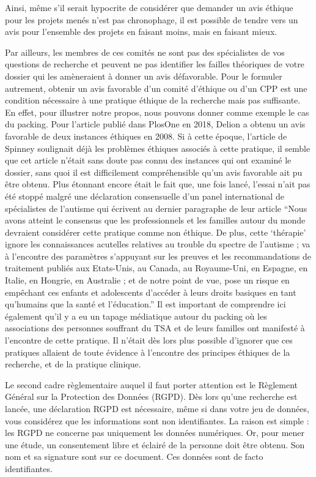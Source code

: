 \documentclass[
  12pt,
]{book}
\begin{document}
Ainsi, même s'il serait hypocrite de considérer que demander un avis éthique pour les projets menés n'est pas chronophage, il est possible de tendre vers un avis pour l'ensemble des projets en faisant moins, mais en faisant mieux.

Par ailleurs, les membres de ces comités ne sont pas des spécialistes de vos questions de recherche et peuvent ne pas identifier les failles théoriques de votre dossier qui les amèneraient à donner un avis défavorable. Pour le formuler autrement, obtenir un avis favorable d'un comité d'éthique ou d'un CPP est une condition nécessaire à une pratique éthique de la recherche mais pas suffisante. En effet, pour illustrer notre propos, nous pouvons donner comme exemple le cas du packing. Pour l'article publié dans PlosOne en 2018, Delion \citeyearpar{Delion2018} a obtenu un avis favorable de deux instances éthiques en 2008. Si à cette époque, l'article de Spinney \citeyearpar{Spinney2007} soulignait déjà les problèmes éthiques associés à cette pratique, il semble que cet article n'était sans doute pas connu des instances qui ont examiné le dossier, sans quoi il est difficilement compréhensible qu'un avis favorable ait pu être obtenu. Plus étonnant encore était le fait que, une fois lancé, l'essai n'ait pas été stoppé malgré une déclaration consensuelle d'un panel international de spécialistes de l'autisme \citep{Amaral2011} qui écrivent au dernier paragraphe de leur article ``Nous avons atteint le consensus que les professionnels et les familles autour du monde devraient considérer cette pratique comme non éthique. De plus, cette `thérapie' ignore les connaissances acutelles relatives au trouble du spectre de l'autisme ; va à l'encontre des paramètres s'appuyant sur les preuves et les recommandations de traitement publiés aux Etats-Unis, au Canada, au Royaume-Uni, en Espagne, en Italie, en Hongrie, en Australie ; et de notre point de vue, pose un risque en empêchant ces enfants et adolescents d'accéder à leurs droits basiques en tant qu'humains que la santé et l'éducation.'' Il est important de comprendre ici également qu'il y a eu un tapage médiatique autour du packing où les associations des personnes souffrant du TSA et de leurs familles ont manifesté à l'encontre de cette pratique. Il n'était dès lors plus possible d'ignorer que ces pratiques allaient de toute évidence à l'encontre des principes éthiques de la recherche, et de la pratique clinique.

Le second cadre règlementaire auquel il faut porter attention est le Règlement Général sur la Protection des Données (RGPD). Dès lors qu'une recherche est lancée, une déclaration RGPD est nécessaire, même si dans votre jeu de données, vous considérez que les informations sont non identifiantes. La raison est simple : les RGPD ne concerne pas uniquement les données numériques. Or, pour mener une étude, un consentement libre et éclairé de la personne doit être obtenu. Son nom et sa signature sont sur ce document. Ces données sont de facto identifiantes.
\end{document}
